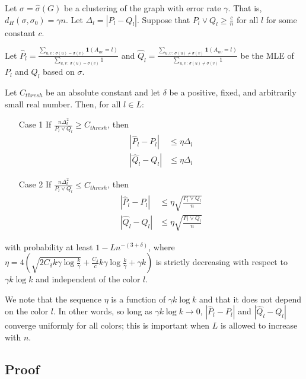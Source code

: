 \documentclass{article}
\begin{document}
\begin{proposition}
\label{prop:estimation_consistency}
Let $\sigma = \hat{\sigma}(G)$ be a clustering of the graph with error rate $\gamma$. That is, $d_H(\sigma, \sigma_0) = \gamma n$. Let $\Delta_l = | P_l - Q_l |$. Suppose that $P_l \vee Q_l \geq \frac{c}{n}$ for all $l$ for some constant $c$. 


Let $\hat{P}_l = \frac{\sum_{u,v \,:\, \sigma(u)=\sigma(v)} \mathbf{1}(A_{uv} = l) }
                      {\sum_{u,v \,:\, \sigma(u) = \sigma(v)} 1}$ and
    $\hat{Q}_l = \frac{\sum_{u,v \,:\, \sigma(u) \neq \sigma(v)} \mathbf{1}(A_{uv} = l) }
                      {\sum_{u,v \,:\, \sigma(u) \neq \sigma(v)} 1}$ be the MLE of $P_l$ and $Q_l$ based on $\sigma$. 

Let $C_{thresh}$ be an absolute constant and let $\delta$ be a positive, fixed, and arbitrarily small real number. Then, for all $l \in L$:

\begin{itemize}
\item[Case 1] If $\frac{n \Delta_l^2}{P_l \vee Q_l} \geq C_{thresh}$, then
\begin{align*}
 | \hat{P}_l - P_l | &\leq \eta \Delta_l \\
 | \hat{Q}_l - Q_l | &\leq \eta \Delta_l 
\end{align*}
\item[Case 2] If $\frac{n \Delta_l^2}{P_l \vee Q_l} \leq C_{thresh}$, then
\begin{align*}
 | \hat{P}_l - P_l | &\leq \eta \sqrt{ \frac{P_l \vee Q_l}{n}} \\
 | \hat{Q}_l - Q_l | &\leq \eta \sqrt{ \frac{P_l \vee Q_l}{n}}
\end{align*}
\end{itemize}
with probability at least $1 - L n^{-(3 + \delta)}$, where $\eta = 4 \left( \sqrt{2 C_\delta k \gamma \log \frac{k}{\gamma} } + \frac{C_\delta}{c} k \gamma \log \frac{k}{\gamma} + \gamma k \right)$ is strictly  decreasing with respect to $\gamma k \log k$ and independent of the color $l$. 
\end{proposition}

We note that the sequence $\eta$ is a function of $\gamma k \log k$ and that it does not depend on the color $l$. In other words, so long as $\gamma k \log k \rightarrow 0$, $| \hat{P}_l - P_l |$ and $|\hat{Q}_l - Q_l|$ converge uniformly for all colors; this is important when $L$ is allowed to increase with $n$. 


\subsection{Proof} 
\end{document}
